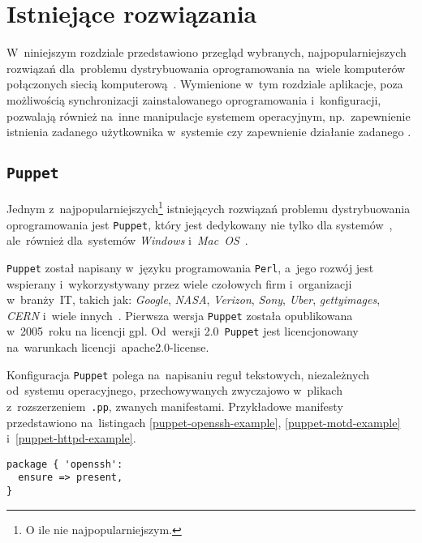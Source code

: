 \documentclass[thesis]{subfiles}
\begin{document}

\section{Istniejące rozwiązania}
\label{sec:istniejace-rozwiazania}

W~niniejszym rozdziale przedstawiono przegląd wybranych, najpopularniejszych rozwiązań dla~problemu dystrybuowania oprogramowania na~wiele komputerów połączonych siecią komputerową~\cite{leading-scms}. Wymienione w~tym rozdziale aplikacje, poza możliwością synchronizacji zainstalowanego oprogramowania i~konfiguracji, pozwalają również na~inne manipulacje systemem operacyjnym, np.~zapewnienie istnienia zadanego użytkownika w~systemie czy zapewnienie działanie zadanego \emph{}.

\subsection{\texttt{Puppet}}

Jednym z~najpopularniejszych\footnote{O ile nie najpopularniejszym.} istniejących rozwiązań problemu dystrybuowania oprogramowania jest \texttt{Puppet}, który jest dedykowany nie tylko dla systemów~, ale~również dla~systemów \emph{Windows} i~\emph{Mac~OS}~\cite{puppet,puppet-examples,puppet-clients}.

\texttt{Puppet} został napisany w~języku programowania \texttt{Perl}, a~jego rozwój jest wspierany i~wykorzystywany przez wiele czołowych firm i~organizacji w~branży~IT, takich jak: \emph{Google}, \emph{NASA}, \emph{Verizon}, \emph{Sony}, \emph{Uber}, \emph{gettyimages}, \emph{CERN} i~wiele innych~\cite{puppet,puppet-cern,puppet-google}. Pierwsza wersja \texttt{Puppet} została opublikowana w~2005~roku na licencji \gls{gpl}. Od~wersji 2.0~\texttt{Puppet} jest licencjonowany na~warunkach licencji~\gls{apache2.0-license}.

Konfiguracja \texttt{Puppet} polega na~napisaniu reguł tekstowych, niezależnych od~systemu operacyjnego, przechowywanych zwyczajowo w~plikach z~rozszerzeniem~\texttt{.pp}, zwanych manifestami. Przykładowe manifesty przedstawiono na~listingach \ref{puppet-openssh-example}, \ref{puppet-motd-example} i~\ref{puppet-httpd-example}.

\begin{lstlisting}[numbers=none,caption={Manifest \texttt{Puppet} gwarantujący, że \texttt{OpenSSH} jest zainstalowany},label=puppet-openssh-example]
package { 'openssh':
  ensure => present,
}
\end{lstlisting}
\end{document}
